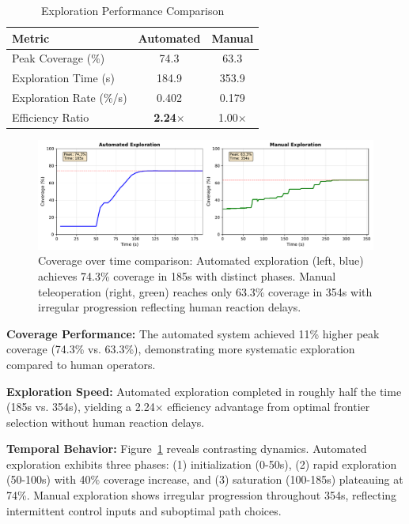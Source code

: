 \documentclass[conference]{IEEEtran}
\begin{document}
\begin{table}[h]
\centering
\caption{Exploration Performance Comparison}
\label{tab:results}
\begin{tabular}{lcc}
\toprule
\textbf{Metric} & \textbf{Automated} & \textbf{Manual} \\
\midrule
Peak Coverage (\%) & 74.3 & 63.3 \\
Exploration Time (s) & 184.9 & 353.9 \\
Exploration Rate (\%/s) & 0.402 & 0.179 \\
Efficiency Ratio & \textbf{2.24$\times$} & 1.00$\times$ \\
\bottomrule
\end{tabular}
\end{table}

\begin{figure}[t]
\centering
\includegraphics[width=\columnwidth]{figures/coverage_comparison.pdf}
\caption{Coverage over time comparison: Automated exploration (left, blue) achieves 74.3\% coverage in 185s with distinct phases. Manual teleoperation (right, green) reaches only 63.3\% coverage in 354s with irregular progression reflecting human reaction delays.}
\label{fig:coverage}
\end{figure}

\textbf{Coverage Performance:} The automated system achieved 11\% higher peak coverage (74.3\% vs. 63.3\%), demonstrating more systematic exploration compared to human operators.

\textbf{Exploration Speed:} Automated exploration completed in roughly half the time (185s vs. 354s), yielding a 2.24$\times$ efficiency advantage from optimal frontier selection without human reaction delays.

\textbf{Temporal Behavior:} Figure~\ref{fig:coverage} reveals contrasting dynamics. Automated exploration exhibits three phases: (1) initialization (0-50s), (2) rapid exploration (50-100s) with 40\% coverage increase, and (3) saturation (100-185s) plateauing at 74\%. Manual exploration shows irregular progression throughout 354s, reflecting intermittent control inputs and suboptimal path choices.
\end{document}
